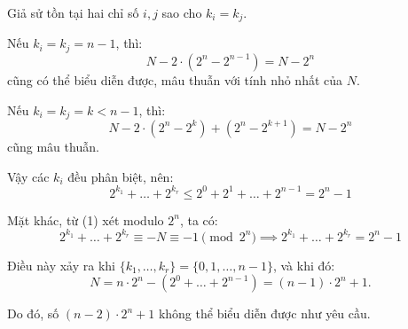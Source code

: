 \documentclass[../01-divisibility.tex]{subfiles}
\begin{document}
\begin{soln}
	Giả sử tồn tại hai chỉ số \( i, j \) sao cho \( k_i = k_j \).

	Nếu \( k_i = k_j = n - 1 \), thì:
	\[
		N - 2 \cdot (2^n - 2^{n-1}) = N - 2^n
	\]
	cũng có thể biểu diễn được, mâu thuẫn với tính nhỏ nhất của \( N \).

	Nếu \( k_i = k_j = k < n - 1 \), thì:
	\[
		N - 2 \cdot (2^n - 2^k) + (2^n - 2^{k+1}) = N - 2^n
	\]
	cũng mâu thuẫn.

	Vậy các \( k_i \) đều phân biệt, nên:
	\[
		2^{k_1} + \dots + 2^{k_r} \leq 2^0 + 2^1 + \dots + 2^{n-1} = 2^n - 1
	\]

	Mặt khác, từ (1) xét modulo \( 2^n \), ta có:
	\[
		2^{k_1} + \dots + 2^{k_r} \equiv -N \equiv -1 \pmod{2^n} \implies 2^{k_1} + \dots + 2^{k_r} = 2^n - 1
	\]

	Điều này xảy ra khi \( \{k_1, \dots, k_r\} = \{0, 1, \dots, n-1\} \), và khi đó:
	\[
		N = n \cdot 2^n - (2^0 + \dots + 2^{n-1}) = (n - 1) \cdot 2^n + 1.
	\]

	Do đó, số \( (n - 2) \cdot 2^n + 1 \) không thể biểu diễn được như yêu cầu.
\end{soln}

\end{document}
